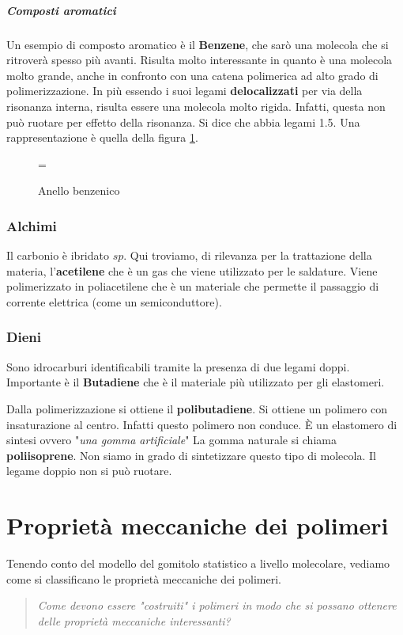 \paragraph{Composti aromatici}
Un esempio di composto aromatico è il \textbf{Benzene}, che sarò una molecola che si ritroverà spesso più avanti.
Risulta molto interessante in quanto è una molecola molto grande, anche in confronto con una catena polimerica ad alto grado di polimerizzazione.
In più essendo i suoi legami \textbf{delocalizzati} per via della risonanza interna, risulta essere una molecola molto rigida.
Infatti, questa non può ruotare per effetto della risonanza. Si dice che abbia legami 1.5.
Una rappresentazione è quella della figura \ref{fig:AnelloBenzenico}.
\begin{figure}
\centering
{}
 \qquad = \qquad%
\caption{Anello benzenico}
\label{fig:AnelloBenzenico}
\end{figure}

\subsection{Alchimi}
Il carbonio è ibridato $sp$.
Qui troviamo, di rilevanza per la trattazione della materia, l'\textbf{acetilene} che è un gas che viene utilizzato per le saldature.
Viene polimerizzato in poliacetilene che è un materiale che permette il passaggio di corrente elettrica (come un semiconduttore).

\subsection{Dieni}
Sono idrocarburi identificabili tramite la presenza di due legami doppi.
Importante è il \textbf{Butadiene} che è il materiale più utilizzato per gli elastomeri.

Dalla polimerizzazione si ottiene il \textbf{polibutadiene}.
Si ottiene un polimero con insaturazione al centro.
Infatti questo polimero non conduce.
È un elastomero di sintesi ovvero "\textit{una gomma artificiale}"
La gomma naturale si chiama \textbf{poliisoprene}.
Non siamo in grado di sintetizzare questo tipo di molecola.
Il legame doppio non si può ruotare.


\chapter{Proprietà meccaniche dei polimeri}\label{chp:MeccanicaPolimeri}
Tenendo conto del modello del gomitolo statistico a livello molecolare, vediamo come si classificano le proprietà meccaniche dei polimeri.
\begin{quote}
\emph{Come devono essere "costruiti" i polimeri in modo che si possano ottenere delle proprietà meccaniche interessanti?}
\end{quote}

